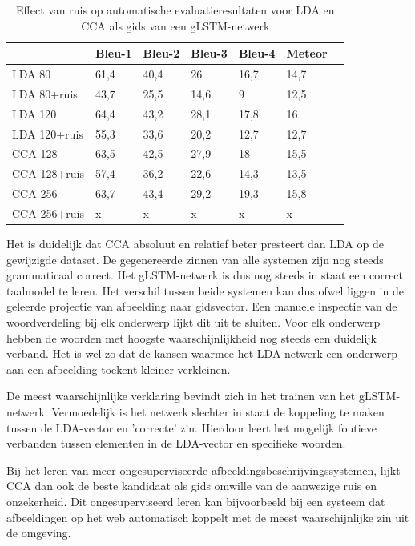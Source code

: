 \begin{table}
	\centering
	\begin{tabular}{lllllll}
		~                  & Bleu-1 & Bleu-2 & Bleu-3 & Bleu-4 & Meteor \\ \hline
		LDA 80        & 61,4   & 40,4 			& 26   & 16,7  & 14,7 \\
		LDA 80+ruis & 43,7  &25,5    &14,6   & 9   & 12,5 \\ \hline
		LDA 120   & 64,4   & 43,2   & 28,1   & 17,8 & 16 \\
		LDA 120+ruis   & 55,3   & 33,6   & 20,2   & 12,7 & 12,7 \\ \hline
		CCA 128   & 63,5   & 42,5   & 27,9   & 18 & 15,5 \\
		CCA 128+ruis   & 57,4   & 36,2   & 22,6   & 14,3 & 13,5 \\ \hline
		CCA 256   & 63,7   & 43,4   & 29,2   & 19,3 & 15,8 \\
		CCA 256+ruis   & x  & x   & x   & x & x \\ \hline			
	\end{tabular}
	\caption{Effect van ruis op automatische evaluatieresultaten voor LDA en CCA als gids van een gLSTM-netwerk}
	\label{table:ruis}
\end{table}

Het is duidelijk dat CCA absoluut en relatief beter presteert dan LDA op de gewijzigde dataset.
De gegenereerde zinnen van alle systemen zijn nog steeds grammaticaal correct.
Het gLSTM-netwerk is dus nog steeds in staat een correct taalmodel te leren.
Het verschil tussen beide systemen kan dus ofwel liggen in de geleerde projectie van afbeelding naar gidsvector.
Een manuele inspectie van de woordverdeling bij elk onderwerp lijkt dit uit te sluiten.
Voor elk onderwerp hebben de woorden met hoogste waarschijnlijkheid nog steeds een duidelijk verband.
Het is wel zo dat de kansen waarmee het LDA-netwerk een onderwerp aan een afbeelding toekent kleiner verkleinen.

De meest waarschijnlijke verklaring bevindt zich in het trainen van het gLSTM-netwerk.
Vermoedelijk is het netwerk slechter in staat de koppeling te maken tussen de LDA-vector en 'correcte' zin. 
Hierdoor leert het mogelijk foutieve verbanden tussen elementen in de LDA-vector en specifieke woorden.
	
Bij het leren van meer ongesuperviseerde afbeeldingsbeschrijvingssystemen, lijkt CCA dan ook de beste kandidaat als gids omwille van de aanwezige ruis en onzekerheid.
Dit ongesuperviseerd leren kan bijvoorbeeld bij een systeem dat afbeeldingen op het web automatisch koppelt met de meest waarschijnlijke zin uit de omgeving.

